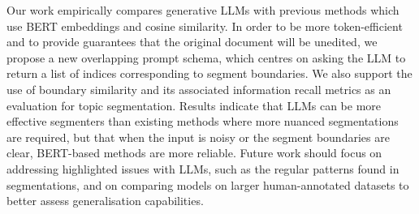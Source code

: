
Our work empirically compares generative LLMs with previous methods which use BERT embeddings and cosine similarity. In order to be more token-efficient and to provide guarantees that the original document will be unedited, we propose a new overlapping prompt schema, which centres on asking the LLM to return a list of indices corresponding to segment boundaries. We also support the use of boundary similarity and its associated information recall metrics as an evaluation for topic segmentation. Results indicate that LLMs can be more effective segmenters than existing methods where more nuanced segmentations are required, but that when the input is noisy or the segment boundaries are clear, BERT-based methods are more reliable. Future work should focus on addressing highlighted issues with LLMs, such as the regular patterns found in segmentations, and on comparing models on larger human-annotated datasets to better assess generalisation capabilities.
